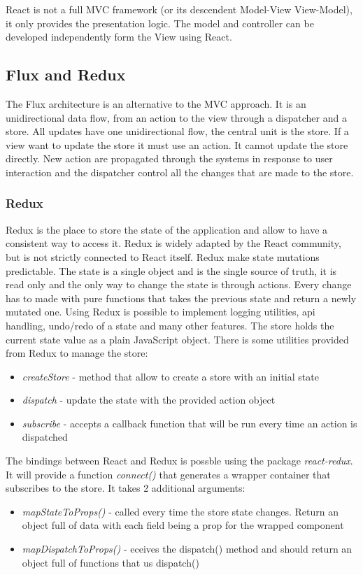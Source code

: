 React is not a full MVC framework (or its descendent Model-View View-Model), it only provides the presentation logic. The model and controller can be developed independently form the View using React.

\subsection*{Flux and Redux}
The Flux architecture is an alternative to the MVC approach. It is an unidirectional data flow, from an action to the view through a dispatcher and a store.
All updates have one unidirectional flow, the central unit is the store. If a view want to update the store it must use an action. It cannot update the store directly.
New action are propagated through the systems in response to user interaction and the dispatcher control all the changes that are made to the store.

\subsubsection*{Redux}
Redux is the place to store the state of the application and allow to have a consistent way to access it. Redux is widely adapted by the React community, but is not strictly connected to React itself. Redux make state mutations predictable.
The state is a single object and is the single source of truth, it is read only and the only way to change the state is through actions. Every change has to made with pure functions that takes the previous state and return a newly mutated one.
Using Redux is possible to implement logging utilities, api handling, undo/redo of a state and many other features.  
The store holds the current state value as a plain JavaScript object. There is some utilities provided from Redux to manage the store:
\begin{itemize}
    \item \textit{createStore} - method that allow to create a store with an initial state
    \item \textit{dispatch} - update the state with the provided action object
    \item \textit{subscribe} - accepts a callback function that will be run every time an action is dispatched
\end{itemize}

The bindings between React and Redux is possble using the package \textit{react-redux}. It will provide a function \textit{connect()} that generates a wrapper container that subscribes to the store. It takes 2 additional arguments:
\begin{itemize}
    \item \textit{mapStateToProps()} - called every time the store state changes. Return an object full of data with each field being a prop for the wrapped component
    \item \textit{mapDispatchToProps()} - eceives the dispatch() method and should return an object full of functions that us dispatch()
\end{itemize}


